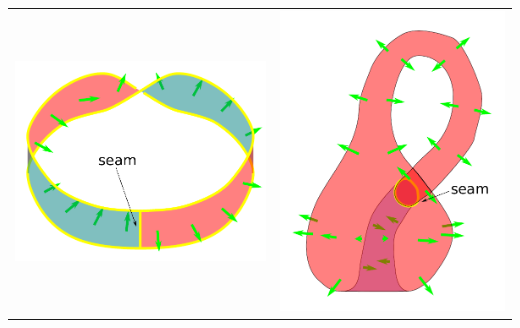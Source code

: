 \documentclass{book}
\begin{document}
\begin{tabular}{cc}
\parbox{0.5\textwidth}{
\includegraphics[scale = 0.7]{Multi-structures/Multisurfaces/Mobius_strip}
} & \parbox{0.5\textwidth}{
\includegraphics[scale = 0.5]{Multi-structures/Multisurfaces/Klein_bottle}
}
\end{tabular}
\end{document}
